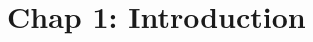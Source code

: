 \documentclass[main.tex]{subfiles}
\begin{document}
\newpage

\section{Chap 1: Introduction}
\end{document}
